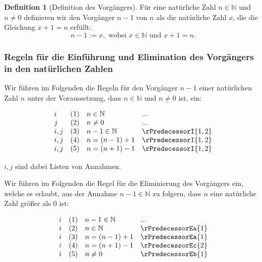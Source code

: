 \documentclass{book}
\theoremstyle{plain}
\theoremstyle{remark}
\theoremstyle{definition}
\newtheorem{definition}{Definition}[section]
\begin{document}
\label{def:predecessor}
\begin{definition}[Definition des Vorgängers]
Für eine natürliche Zahl \( n \in \mathbb{N} \) und \( n \neq 0 \) definieren wir den Vorgänger \( n-1 \) von \( n \) als die natürliche Zahl \( x \), die die Gleichung \( x + 1 = n \) erfüllt:
\[
n-1 := x, \text{ wobei } x \in \mathbb{N} \text{ und } x + 1 = n.
\]
\end{definition}

\subsubsection{Regeln für die Einführung und Elimination des Vorgängers in den  natürlichen Zahlen}
\label{rule:rPredecessorI} \label{rule:rPredecessorEa} \label{rule:rPredecessorEb} \label{rule:rPredecessorEc}

Wir führen im Folgenden die Regeln für den Vorgänger \(n-1\) einer natürlichen Zahl \(n\) unter der Voraussetzung, dass \(n \in \mathbb{N}\) und \(n \neq 0\) ist, ein:

\[
\begin{array}{llll}
	i & (1) & n \in \mathbb{N} & ... \\
	j & (2) & n \neq 0 & ... \\
	i,j & (3) & n-1 \in \mathbb{N} & \rPredecessorI{1, 2} \\
        i,j & (4) & n = (n-1)+1 & \rPredecessorI{1,2} \\
        i,j & (5) & n = (n+1)-1 & \rPredecessorI{1,2} \\
\end{array}
\]

\(i, j\) sind dabei Listen von Annahmen.

Wir führen im Folgenden die Regel für die Eliminierung des Vorgängers ein, welche es erlaubt, aus der Annahme \(n-1\in\mathbb{N}\) zu folgern, dass \(n\) eine natürliche Zahl größer als \(0\) ist:

\[
\begin{array}{llll}
	i & (1) & n-1 \in \mathbb{N} & ... \\
	i & (2) & n \in \mathbb{N} & \rPredecessorEa{1} \\
    i & (3) & n = (n-1)+1 & \rPredecessorEa{1} \\
    i & (4) & n = (n+1)-1 & \rPredecessorEc{2} \\
	i & (5) & n \neq 0 & \rPredecessorEb{1} \\
\end{array}
\]
\end{document}
